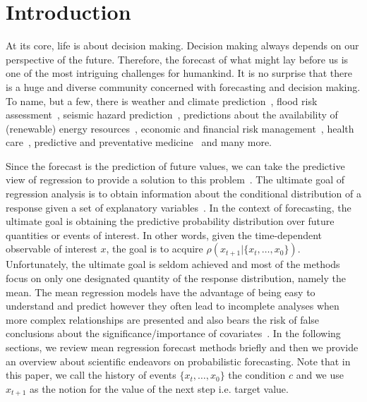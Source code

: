 \documentclass{ieeeaccess}
\begin{document}
\titlepgskip=-15pt

\maketitle

\section{Introduction}
\label{sec:introduction}
At its core, life is about decision making. Decision making always depends on our perspective of the future. Therefore, the forecast of what might lay before us is one of the most intriguing challenges for humankind. It is no surprise that there is a huge and diverse community concerned with forecasting and decision making. To name, but a few, there is weather and climate prediction~\cite{racah2017extremeweather,rodrigues2018deepdownscale}, flood risk assessment~\cite{wiesel2018ml}, seismic hazard prediction~\cite{DBLP:journals/corr/abs-1810-01965,DBLP:journals/corr/abs-1809-02880}, predictions about the availability of (renewable) energy resources~\cite{gensler2018multi,DBLP:journals/corr/ChenWKZ17}, economic and financial risk management~\cite{DBLP:journals/corr/abs-1811-10791,DBLP:journals/corr/abs-1811-03711}, health care~\cite{DBLP:journals/corr/abs-1812-00371,DBLP:journals/corr/abs-1811-12234,DBLP:journals/corr/abs-1711-06402}, predictive and preventative medicine~\cite{zitnik2019machine} and many more. 

Since the forecast is the prediction of future values, we can take the predictive view of regression to provide a solution to this problem~\cite{gneiting2014probabilistic}. The ultimate goal of regression analysis is to obtain information about the conditional distribution of a response given a set of explanatory variables~\cite{hothorn2014conditional}. In the context of forecasting, the ultimate goal is obtaining the predictive probability distribution over future quantities or events of interest. In other words, given the time-dependent observable of interest $x$, the goal is to acquire $\rho(x_{t+1}|\{x_t,\ldots,x_0\})$. Unfortunately, the ultimate goal is seldom achieved and most of the methods focus on only one designated quantity of the response distribution, namely the mean. The mean regression models have the advantage of being easy to understand and predict however they often lead to incomplete analyses when more complex relationships are presented and also bears the risk of false conclusions about the significance/importance of covariates~\cite{kneib2013beyond}. In the following sections, we review mean regression forecast methods briefly and then we provide an overview about scientific endeavors on probabilistic forecasting. Note that in this paper, we call the history of events $\{x_{t},\ldots,x_0\}$ the condition $c$ and we use $x_{t+1}$ as the notion for the value of the next step i.e. target value.
\end{document}
